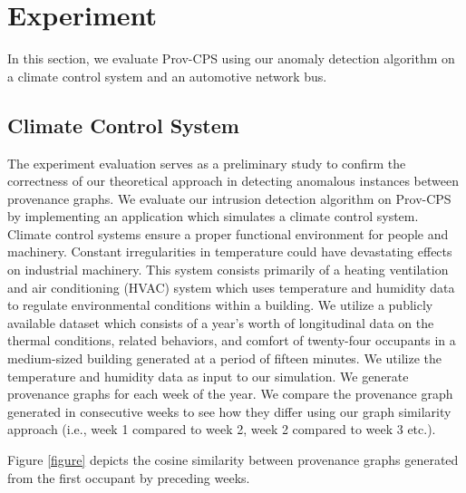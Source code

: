 
\chapter{Experiment}

In this section, we evaluate Prov-CPS using our anomaly detection algorithm on a climate control system and an automotive network bus.

\section{Climate Control System}
The experiment evaluation serves as a preliminary study to confirm the correctness of our theoretical approach in detecting anomalous instances between provenance graphs. We evaluate our intrusion detection algorithm on Prov-CPS by implementing an application which simulates a climate control system. Climate control systems ensure a proper functional environment for people and machinery. Constant irregularities in temperature could have devastating effects on industrial machinery. This system consists primarily of a heating ventilation and air conditioning (HVAC) system which uses temperature and humidity data to regulate environmental conditions within a building. We utilize a publicly available dataset \cite{LANGEVIN201594} which consists of a year's worth of longitudinal data on the thermal conditions, related behaviors, and comfort of twenty-four occupants in a medium-sized building generated at  a period of fifteen minutes. We utilize the temperature and humidity data as input to our simulation. We generate provenance graphs for each week of the year. We compare the provenance graph generated in consecutive weeks to see how they differ using our graph similarity approach (i.e., week 1 compared to week 2, week 2 compared to week 3 etc.). 
\par Figure \ref{figure} depicts the cosine similarity between provenance graphs generated from the first occupant by preceding weeks. 


